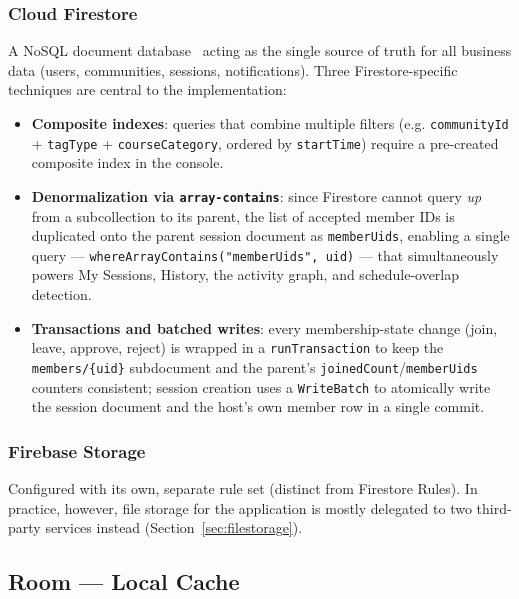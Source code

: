 \subsubsection{Cloud Firestore}
A NoSQL document database~\cite{firestore-docs} acting as the single source of truth for all business data (users, communities, sessions, notifications). Three Firestore-specific techniques are central to the implementation:
\begin{itemize}
    \item \textbf{Composite indexes}: queries that combine multiple filters (e.g. \texttt{communityId} + \texttt{tagType} + \texttt{courseCategory}, ordered by \texttt{startTime}) require a pre-created composite index in the console.
    \item \textbf{Denormalization via \texttt{array-contains}}: since Firestore cannot query \emph{up} from a subcollection to its parent, the list of accepted member IDs is duplicated onto the parent session document as \texttt{memberUids}, enabling a single query — \texttt{whereArrayContains("memberUids", uid)} — that simultaneously powers My Sessions, History, the activity graph, and schedule-overlap detection.
    \item \textbf{Transactions and batched writes}: every membership-state change (join, leave, approve, reject) is wrapped in a \texttt{runTransaction} to keep the \texttt{members/\{uid\}} subdocument and the parent's \texttt{joinedCount}/\texttt{memberUids} counters consistent; session creation uses a \texttt{WriteBatch} to atomically write the session document and the host's own member row in a single commit.
\end{itemize}

\subsubsection{Firebase Storage}
Configured with its own, separate rule set (distinct from Firestore Rules). In practice, however, file storage for the application is mostly delegated to two third-party services instead (Section~\ref{sec:filestorage}).

\subsection{Room — Local Cache}

